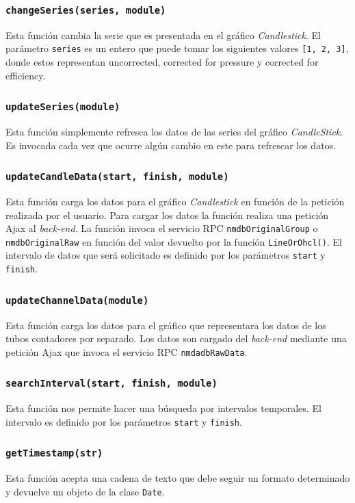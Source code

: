 		\subsubsection{\texttt{changeSeries(series, module)}}
			Esta función cambia la serie que es presentada en el gráfico \emph{Candlestick}. El parámetro \texttt{series} es un entero que
			puede tomar los siguientes valores \texttt{[1, 2, 3]}, donde estos representan uncorrected, corrected for pressure y
			corrected for efficiency.
		\subsubsection{\texttt{updateSeries(module)}}
			Esta función simplemente refresca los datos de las series del gráfico \emph{CandleStick}. Es invocada cada vez que ocurre
			algún cambio en este para refrescar los datos.
		\subsubsection{\texttt{updateCandleData(start, finish, module)}}
			Esta función carga los datos para el gráfico \emph{Candlestick} en función de la petición realizada por el usuario. Para
			cargar los datos la función realiza una petición Ajax al \emph{back-end}. La función invoca el servicio RPC
			\texttt{nmdbOriginalGroup} o \texttt{nmdbOriginalRaw} en función del valor devuelto por la función \texttt{LineOrOhcl()}. El
			intervalo de datos que será solicitado es definido por los parámetros \texttt{start} y \texttt{finish}. 
		\subsubsection{\texttt{updateChannelData(module)}}
			Esta función carga los datos para el gráfico que representara los datos de los tubos contadores por separado. Los datos son
			cargado del \emph{back-end} mediante una petición Ajax que invoca el servicio RPC \texttt{nmdadbRawData}.
		\subsubsection{\texttt{searchInterval(start, finish, module)}}
			Esta función nos permite hacer una búsqueda por intervalos temporales. El intervalo es definido por los parámetros
			\texttt{start} y \texttt{finish}.
		\subsubsection{\texttt{getTimestamp(str)}}
			Esta función acepta una cadena de texto que debe seguir un formato determinado y devuelve un objeto de la clase \texttt{Date}. 
